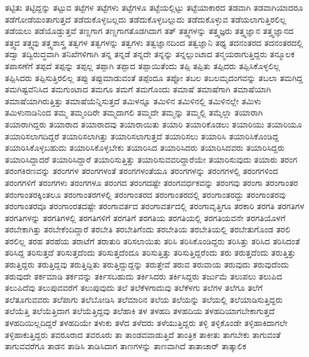 {ತಟ್ಟಿತು
ತಟ್ಟಿದ್ದನ್ನು
ತಟ್ಟುವ
ತಟ್ಟೆಗಳ
ತಟ್ಟೆಗಳು
ತಟ್ಟೆಗಳೂ
ತಟ್ಟೆಯಲ್ಲಿಟ್ಟು
ತಟ್ಟೆಯಾಕಾರದ
ತಡವಾಗಿ
ತಡವಾಗಿಯಾದರೂ
ತಡೆಗೋಡೆಯಂತಾಗುತ್ತದೆ
ತಡೆದುಕೊಳ್ಳಬಲ್ಲದು
ತಡೆದುಕೊಳ್ಳಬಲ್ಲುದು
ತಡೆದುಕೊಳ್ಳುವ
ತಡೆಯಲಾಗುತ್ತಿರಲಿಲ್ಲ
ತಡೆಯಲು
ತಡೆಯೊಡ್ಡುತ್ತವೆ
ತಣ್ಣಗಾಗ
ತಣ್ಣಗಾಗತೊಡಗಿದಾಗ
ತತ್
ತತ್ತ್ವಗಳನ್ನು
ತತ್ತ್ವಜ್ಞರು
ತತ್ತ್ವಜ್ಞಾನ
ತತ್ತ್ವಜ್ಞಾನದ
ತತ್ತ್ವದ
ತತ್ತ್ವವು
ತತ್ತ್ವಶಾಸ್ತ್ರ
ತತ್ವಗಳ
ತತ್ವಗಳನ್ನು
ತತ್ವಗಳು
ತತ್ವಜ್ಞಾನದಿಂದ
ತತ್ವಜ್ಞಾನಿ
ತಥ್ಯ
ತದನಂತರದ
ತದನಂತರದಲ್ಲಿ
ತದ್ವಾ
ತದ್ವಿರುದ್ಧವಾಗಿ
ತನಿಖೆಗಳಿಗಾಗಿ
ತನ್ನ
ತನ್ನಡೆ
ತನ್ನದೇ
ತನ್ನನ್ನು
ತನ್ನಲ್ಲುಂಟಾದ
ತನ್ಮಯರಾಗುತ್ತಿದ್ದರು
ತನ್ಮೂಲಕ
ತಪಾಸಣೆಗೆ
ತಪ್ಪದೆ
ತಪ್ಪನ್ನು
ತಪ್ಪಲ್ಲ
ತಪ್ಪಾಗಿ
ತಪ್ಪಾದ
ತಪ್ಪಾಯಿತೆಂದು
ತಪ್ಪಿ
ತಪ್ಪಿತು
ತಪ್ಪಿದರು
ತಪ್ಪಿಸಿಕೊಳ್ಳಲಿಲ್ಲ
ತಪ್ಪಿಸಿದರು
ತಪ್ಪಿಸುತ್ತಿರಲಿಲ್ಲ
ತಪ್ಪು
ತಪ್ಪುಮಾಡುವಂತೆ
ತಪ್ಪೆಂದೂ
ತಪ್ಪೋ
ತಬಲ
ತಬಲಮೃದಂಗವನ್ನು
ತಬಲಾ
ತಮಗಿದ್ದ
ತಮಗಿಷ್ಟವೆನಿಸಿದ
ತಮಗುಂಟಾದ
ತಮಗೂ
ತಮಗೆ
ತಮಗೊಂದು
ತಮಾಷೆ
ತಮಾಷೆಗಾಗಿ
ತಮಾಷೆಯಾಗಿ
ತಮಾಷೆಯಾಗಿರುತ್ತಿತ್ತು
ತಮಾಷೆಯೆನ್ನಿಸುತ್ತದೆ
ತಮಿಳನ್ನೂ
ತಮಿಳಿನ
ತಮಿಳಿನಲ್ಲಿ
ತಮಿಳಿನಲ್ಲೇ
ತಮಿಳು
ತಮಿಳುನಾಡಿನಿಂದ
ತಮ್ಮ
ತಮ್ಮಂದಿರೇ
ತಮ್ಮದಾಗಲಿ
ತಮ್ಮದೇ
ತಮ್ಮನ್ನು
ತಮ್ಮಲ್ಲಿ
ತಮ್ಮೆಲ್ಲಾ
ತಯಾರಾಗಿ
ತಯಾರಾಗಿದ್ದರು
ತಯಾರಾದ
ತಯಾರಾದವು
ತಯಾರಾಯಿತು
ತಯಾರಿ
ತಯಾರಿಕೊಡಲು
ತಯಾರಿಯು
ತಯಾರಿಯೂ
ತಯಾರಿಸಲಾಗದಿದ್ದರೆ
ತಯಾರಿಸಲಾಗಿತ್ತು
ತಯಾರಿಸಲಾಗುತ್ತದೆ
ತಯಾರಿಸಲು
ತಯಾರಿಸಿ
ತಯಾರಿಸಿಕೊಂಡಿದ್ದ
ತಯಾರಿಸಿಕೊಳ್ಳಬಹುದು
ತಯಾರಿಸಿಕೊಳ್ಳಬೇಕು
ತಯಾರಿಸಿದ
ತಯಾರಿಸಿದರು
ತಯಾರಿಸಿದವರು
ತಯಾರಿಸಿದ್ದರು
ತಯಾರಿಸಿದ್ದಾದರೆ
ತಯಾರಿಸಿದ್ದಾರೆ
ತಯಾರಿಸುತ್ತಿತ್ತು
ತಯಾರಿಸುವವರಿದ್ದಾರೆಯೇ
ತಯಾರಿಸುವುದು
ತಯಾರು
ತರಂಗ
ತರಂಗಕಿರಣವನ್ನು
ತರಂಗಗಳ
ತರಂಗಗಳಂತೆ
ತರಂಗಗಳಂತೆಯೂ
ತರಂಗಗಳನ್ನು
ತರಂಗಗಳಲ್ಲಿ
ತರಂಗಗಳಿಂದ
ತರಂಗಗಳಿಗೆ
ತರಂಗಗಳು
ತರಂಗಗಳೂ
ತರಂಗದ
ತರಂಗದಷ್ಟೇ
ತರಂಗವರ್ಧಕವನ್ನು
ತರಂಗವು
ತರಂಗಾ
ತರಂಗಾಂತರ
ತರಂಗಾಂತರಕ್ಕಿಂತಲೂ
ತರಂಗಾಂತರಗಳಲ್ಲಿ
ತರಂಗಾಂತರದ
ತರಂಗಾಂತರದಲ್ಲಿ
ತರಂಗಾಂತರದ್ದು
ತರಂಗಾಂತರವು
ತರಂಗಾಂತರವೂ
ತರಂಗಾಂರತದಷ್ಟೇ
ತರಂಗಾವರ್ತದ
ತರಂಗಾವರ್ತದಲ್ಲಿ
ತರಂಗಾವೃತ್ತಿಗೂ
ತರಕಾರಿ
ತರಗತಿ
ತರಗತಿಗಳ
ತರಗತಿಗಳನ್ನು
ತರಗತಿಗಳಲ್ಲಿ
ತರಗತಿಗಳಿಗೆ
ತರಗತಿಗೆ
ತರಗತಿಯ
ತರಗತಿಯಲ್ಲಿ
ತರಗತಿಯವನೇ
ತರಗತಿಯೊಳಗೆ
ತರಬೇಕಾಗಿತ್ತು
ತರಬೇಕೆಂದಿದ್ದಾರೆ
ತರಬೇತಿ
ತರಬೇತಿಗೆಂದು
ತರಬೇತಿಯ
ತರಬೇತಿಯಲ್ಲಿ
ತರಬೇತುಗೊಂಡ
ತರಲಿ
ತರಲಿಲ್ಲ
ತರಹ
ತರಹೆಯ
ತರಾಟೆಗೆ
ತರಾತುರಿ
ತರಿಸಲಾಯಿತು
ತರಿಸಿ
ತರಿಸಿಕೊಂಡಿದ್ದರು
ತರಿಸಿತ್ತು
ತರಿಸಿದ
ತರಿಸಿದಂತೆ
ತರಿಸಿದ್ದ
ತರಿಸುತ್ತದೆ
ತರಿಸುತ್ತದೆಂದು
ತರಿಸುತ್ತದೆಂದೂ
ತರಿಸುತ್ತಿತ್ತು
ತರಿಸುತ್ತಿದ್ದರೆಂದು
ತರು
ತರುತ್ತದೆಂದು
ತರುತ್ತಿತ್ತು
ತರುತ್ತಿದ್ದರು
ತರುತ್ತಿದ್ದವು
ತರುತ್ತಿದ್ದಿತು
ತರುತ್ತಿದ್ದುದ್ದನ್ನು
ತರುತ್ತೇವೆ
ತರುವ
ತರುವಾಯ
ತರುವುದು
ತರುವುದೆಂದು
ತರುವುದೇ
ತರ್ಕಮಾಡಿ
ತರ್ಕವನ್ನು
ತರ್ಕಿಸಬಹುದು
ತರ್ಕಿಸಿದರು
ತರ್ಕಿಸಿದ್ದರು
ತರ್ಜುಮೆ
ತಲುಪಲು
ತಲುಪಿದ
ತಲುಪಿದೆವು
ತಲುಪುವವರೆಗೆ
ತಲುಪುವುದು
ತಲೆ
ತಲೆಕೆಳಗಾದುವು
ತಲೆಕೆಳಗು
ತಲೆಗಳ
ತಲೆಗೂ
ತಲೆಗೆ
ತಲೆತೂಗುವವರು
ತಲೆಪಾಗು
ತಲೆಬೋಡಿಸಿ
ತಲೆಮಾರಿನ
ತಲೆಯ
ತಲೆಯನ್ನು
ತಲೆಯಲ್ಲಿ
ತಲೆಯಾಡಿಸುತ್ತಿದ್ದರು
ತಲೆಯೆತ್ತಿ
ತಲೆಯೆತ್ತಿದಾಗ
ತಲೆಯೆತ್ತಿದ್ದವು
ತಲೆಹಾಕಿ
ತಳ
ತಳಹದಿ
ತಳಹದಿಯ
ತಳಹದಿಯಾಗಬೇಕಾಗುತ್ತದೆ
ತಳಹದಿಯಿಲ್ಲದಿದ್ದರೆ
ತಳಹದಿಯೇ
ತಳುಕು
ತಳೆದ
ತಳೆದರು
ತಳೆಯುತ್ತಿದ್ದರು
ತಳ್ಳಿ
ತಳ್ಳಿಕೊಂಡೇ
ತಳ್ಳಿಹಾಕಿದಾಗಲೇ
ತಳ್ಳಿಹಾಕುತ್ತಿದ್ದರು
ತವರೂರಾದ
ತವರೂರು
ತಾ
ತಾಂಡವವಾಡುತ್ತಿದೆ
ತಾಂತ್ರಿಕ
ತಾಕೀತು
ತಾಗಬೇಕು
ತಾಗುವಂತೆ
ತಾಗುವವರೆಗೂ
ತಾಡನ
ತಾಡಿಸಿ
ತಾಡಿಸಿದಾಗ
ತಾಣಗಳನ್ನು
ತಾಣವಾಗಿದೆ
ತಾತಾಚಾರ್
ತಾತ್ಕಾಲಿಕ
}
